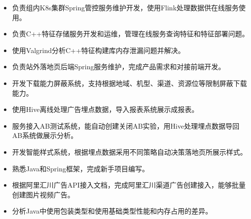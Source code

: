\documentclass{resume}
\begin{document}

\begin{itemize}
  \item 负责组内K8s集群Spring管控服务维护开发，使用Flink处理数据供在线服务使用。
  \item 负责C++特征存储服务开发和运维，管理在线服务查询特征和特征部署问题。
  \item 使用Valgrind分析C++特征构建库内存泄漏问题并解决。
\end{itemize}

\begin{itemize}
  \item 负责站外落地页后端Spring服务维护，完成产品需求和对接前端开发。
  \item 开发下载能力屏蔽系统，支持根据地域、机型、渠道、资源位等限制屏蔽下载能力。
  \item 使用Hive离线处理广告埋点数据，导入报表系统展示成报表。
  \item 服务接入AB测试系统，能自动创建关闭AB实验，用Hive处理埋点数据导回AB系统做展示分析。
  \item 开发智能样式系统，根据埋点数据采用不同策略自动决策落地页所展示样式。
\end{itemize}

\begin{itemize}
  \item 熟悉Java和Spring框架，完成新手项目编写。
  \item 根据阿里汇川广告API接入文档，完成阿里汇川渠道广告创建接入，能够批量创建图片视频广告。
  \item 分析Java中使用包装类型和使用基础类型性能和内存占用的差异。
\end{itemize}

\end{document}
